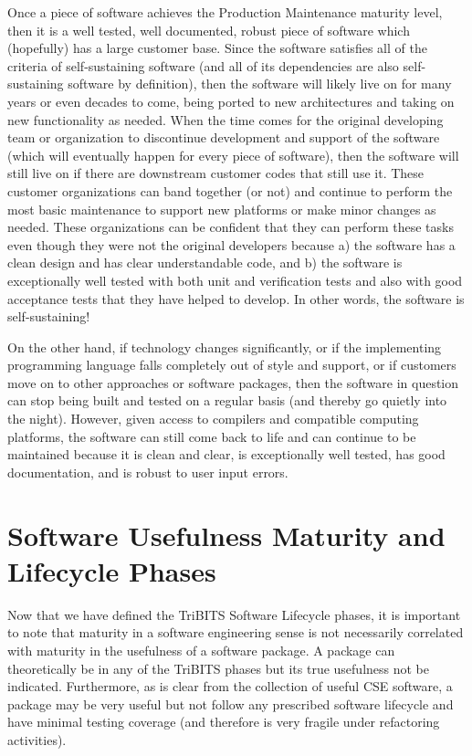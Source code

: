 \documentclass[11pt]{SANDreport}
\begin{document}
Once a piece of software achieves the Production Maintenance maturity
level, then it is a well tested, well documented, robust piece of
software which (hopefully) has a large customer base.  Since the
software satisfies all of the criteria of self-sustaining software
(and all of its dependencies are also self-sustaining software by
definition), then the software will likely live on for many years or
even decades to come, being ported to new architectures and taking on
new functionality as needed.  When the time comes for the original
developing team or organization to discontinue development and support
of the software (which will eventually happen for every piece of
software), then the software will still live on if there are
downstream customer codes that still use it.  These customer
organizations can band together (or not) and continue to perform the
most basic maintenance to support new platforms or make minor changes
as needed.  These organizations can be confident that they can perform
these tasks even though they were not the original developers because
a) the software has a clean design and has clear understandable code,
and b) the software is exceptionally well tested with both unit and
verification tests and also with good acceptance tests that they have
helped to develop.  In other words, the software is self-sustaining!

On the other hand, if technology changes significantly, or if the
implementing programming language falls completely out of style and
support, or if customers move on to other approaches or software
packages, then the software in question can stop being built and
tested on a regular basis (and thereby go quietly into the night).
However, given access to compilers and compatible computing
platforms, the software can still come back to life and can continue
to be maintained because it is clean and clear, is exceptionally well
tested, has good documentation, and is robust to user input errors.


%
{}\section{Software Usefulness Maturity and Lifecycle Phases}
\label{sec:usefulness_maturity_lifecycle_phases}
%

Now that we have defined the TriBITS Software Lifecycle phases, it is
important to note that maturity in a software engineering sense is not
necessarily correlated with maturity in the usefulness of a software
package.  A package can theoretically be in any of the TriBITS phases
but its true usefulness not be indicated.  Furthermore, as is clear
from the collection of useful CSE software, a package may be very
useful but not follow any prescribed software lifecycle and have
minimal testing coverage (and therefore is very fragile under
refactoring activities).
\end{document}
